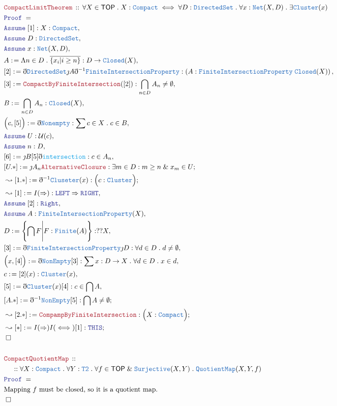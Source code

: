 \documentclass[12pt]{scrartcl}
\newcommand{\TYPE}[1]{\textcolor{NavyBlue}{\mathtt{#1}}}
\newcommand{\FUNC}[1]{\textcolor{Cerulean}{\mathtt{#1}}}
\newcommand{\LOGIC}[1]{\textcolor{Blue}{\mathtt{#1}}}
\newcommand{\THM}[1]{\textcolor{Maroon}{\mathtt{#1}}}
\renewcommand{\.}{\; . \;}
\newcommand{\de}{: \kern 0.1pc =}
\newcommand{\Theorem}[2]{& \THM{#1} \, :: \, #2 \\ & \Proof = \\ }
\newcommand{\NewLine}{\\ & \kern 1pc}
\newcommand{\Page}[1]{ \begin{align*} #1 \end{align*}   }
\newcommand{ \bd }{ \ByDef }
\newcommand{\Explain}[1]{& \text{#1.} \\}
\renewcommand{\And}{\; \& \;}
\newcommand{\Imply}{\Rightarrow}
\newcommand{\Surj}{\TYPE{Surjective}}
\newcommand{\Say}[3]{& #1 \de #2 : #3, \\}
\newcommand{\Conclude}[3]{& #1 \de #2 : #3; \\}
\newcommand{\Derive}[3]{& \leadsto #1 \de #2 : #3, \\}
\newcommand{\DeriveConclude}[3]{& \leadsto #1 \de #2 : #3 ; \\}
\newcommand{\Assume}[2]{& \LOGIC{Assume} \; #1 : #2, \\}
\newcommand{\QED}{\; \square}
\newcommand{\EndProof}{& \QED \\}
\newcommand{\ByDef}{\eth}
\newcommand{\ByConstr}{\jmath}
\newcommand{\Proof}{\LOGIC{Proof} \; }
\newcommand{\QM}{\TYPE{QuotientMap}}
\newcommand{\Compact}{\TYPE{Compact}}
\newcommand{\TOP}{\mathsf{TOP}}
\renewcommand{\U}{\mathcal{U}}
\begin{document}
\Page{
	\Theorem{CompactLimitTheorem}
	{
		\forall X \in \TOP \.
		X : \TYPE{Compact} \iff
		\forall D : \TYPE{DirectedSet}	\.
		\forall x : \TYPE{Net}(X,D) \.
		\exists \TYPE{Cluster}(x)
	}
	\Assume{[1]}{X : \TYPE{Compact}}
	\Assume{D}{\TYPE{DirectedSet}}
	\Assume{x}{\TYPE{Net}(X,D)}
	\Say{A}{\Lambda n \in D \. \overline{\{ x_i | i \ge n \}}}{ D \to \TYPE{Closed}(X)  } 
	\Say{[2]}{\bd \TYPE{DirectedSet}\ByConstr A \bd^{-1} \TYPE{FiniteIntersectionProperty}}
	{
		\left( A : \TYPE{FiniteIntersectionProperty}\; \TYPE{Closed}(X)   \right) 
	}
	\Say{[3]}{\THM{CompactByFiniteIntersection}([2])}
	{
		\bigcap_{n \in D} A_n \neq \emptyset
	}
	\Say{B}{\bigcap_{n \in D} A_n}{\TYPE{Closed}(X)}
	\Say{\Big(c,[5]\Big)}{\bd \TYPE{Nonempty}}{\sum c \in X \. c \in B }
	\Assume{U}{\U(c)}
	\Assume{n}{D}
	\Say{[6]}{\ByConstr B [5] \bd \FUNC{intersection}}
	{
		c \in A_n
	}
	\Conclude{[U.*]}{\ByConstr A_n\THM{AlternativeClosure}}
	{
		\exists m \in D : m \ge n \And x_m \in U
	}
	\DeriveConclude{[1.*]}{\bd^{-1} \TYPE{Cluseter}(x)}{\Big( c : \TYPE{Cluster}\Big)}
	\Derive{[1]}{I(\Imply)}{ \LOGIC{LEFT} \Imply  \LOGIC{RIGHT} }
	\Assume{[2]}{\LOGIC{Right}}
	\Assume{A}{\TYPE{FiniteIntersectionProperty}(X)}
	\Say{D}{\left\{ \bigcap F \Bigg|  F : \TYPE{Finite}(A)  \right\}}{??X}
	\Say{[3]}{\bd \TYPE{FiniteIntersectionProperty}\ByConstr D}
	{
		\forall d \in D \. d \neq \emptyset
	}
	\Say{\Big( x, [4] \Big)}{\bd \TYPE{NonEmpty}[3]}
	{
		\sum x : D \to X \. \forall d \in D \. x \in d
	}
	\Say{c}{[2](x)}{\TYPE{Cluster}(x)}
	\Say{[5]}{\bd \TYPE{Cluster}(x)[4]}{c \in \bigcap A } 
	\Conclude{[A.*]}{\bd^{-1} \TYPE{NonEmpty}[5]}{\bigcap A \neq \emptyset}
	\DeriveConclude{[2.*]}{\THM{CompampByFiniteIntersection}}{\Big( X : \TYPE{Compact}  \Big)}
	\DeriveConclude{[*]}{I(\Imply)I(\iff)[1]}{\LOGIC{THIS}}
	\EndProof
	\\
	\Theorem{CompactQuotientMap}
	{
		\NewLine ::		
		\forall X : \Compact \.
		\forall Y : \TYPE{T2} \.
		\forall f \in \TOP \And \Surj(X,Y) \.
		\QM(X,Y,f)
	}
	\Explain{Mapping  $f$ must be closed, so it is a quotient map}
	\EndProof
}
\newpage
\end{document}
